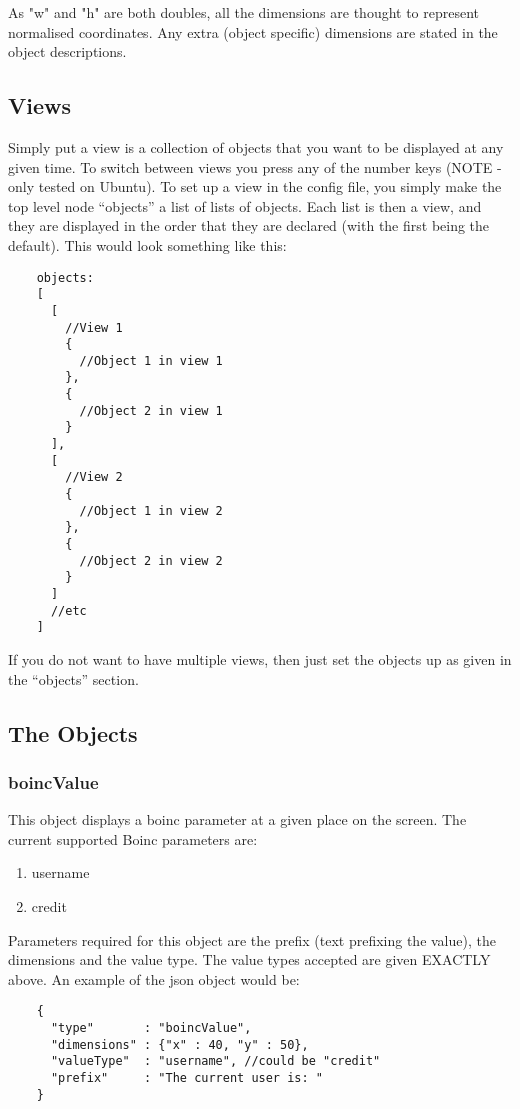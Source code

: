 \documentclass[a4paper]{article}
\begin{document}
  As "w" and "h" are both doubles, all the dimensions are thought to
  represent normalised coordinates. Any extra (object specific) dimensions
  are stated in the object descriptions.
  \subsection{Views}
  Simply put a view is a collection of objects that you want to be
  displayed at any given time. To switch between views you press any of the
  number keys (NOTE - only tested on Ubuntu). To set up a view in the config
  file, you simply make the top level node ``objects'' a list of lists of
  objects. Each list is then a view, and they are displayed in the order
  that they are declared (with the first being the default). This would look
  something like this:

  \begin{verbatim}
    objects:
    [
      [
        //View 1
        {
          //Object 1 in view 1
        },
        {
          //Object 2 in view 1
        }
      ],
      [
        //View 2
        {
          //Object 1 in view 2
        },
        {
          //Object 2 in view 2
        }
      ]
      //etc
    ]
  \end{verbatim}

  If you do not want to have multiple views, then just set the objects up
  as given in the ``objects'' section.

  \subsection{The Objects}

  \subsubsection{boincValue}
  This object displays a boinc parameter at a given place on the screen.
  The current supported Boinc parameters are:

  \begin{enumerate}
    \item username
    \item credit
  \end{enumerate}

  Parameters required for this object are the prefix (text prefixing the
  value), the dimensions and the value type. The value types accepted are
  given EXACTLY above. An example of the json object would be:

  \begin{verbatim}
    {
      "type"       : "boincValue",
      "dimensions" : {"x" : 40, "y" : 50},
      "valueType"  : "username", //could be "credit"
      "prefix"     : "The current user is: "
    }
  \end{verbatim}
\end{document}
